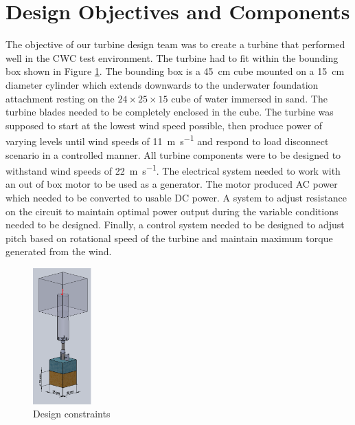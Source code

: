 \documentclass[../ewet_cwc_report.tex]{subfiles}
\begin{document}
\section{Design Objectives and Components}

\noindent
The objective of our turbine design team was to create a
turbine that performed well in the CWC test environment. The
turbine had to fit within the bounding box shown in
Figure \ref{img:constraints}. The bounding box is a
\qty{45}{\cm} cube mounted on a \qty{15}{\cm} diameter cylinder
which extends downwards to the underwater foundation attachment
resting on the $24 \times 25 \times 15$ cube of water immersed
in sand.  The turbine blades needed to be completely enclosed
in the cube. The turbine was supposed to start at the lowest
wind speed possible, then produce power of varying levels until
wind speeds of \qty{11}{\m\per\s} and respond to load
disconnect scenario in a controlled manner.  All turbine
components were to be designed to withstand wind speeds of
\qty{22}{\m\per\s}. The electrical system needed to work with
an out of box motor to be used as a generator. The motor
produced AC power which needed to be converted to usable DC
power. A system to adjust resistance on the circuit to maintain
optimal power output during the variable conditions needed to
be designed. Finally, a control system needed to be designed to
adjust pitch based on rotational speed of the turbine and
maintain maximum torque generated from the wind.

\begin{figure}[th]
  \centering
  \includegraphics[width=0.2\textwidth]{../_images/design_constraints.png}
  \caption{Design constraints}
  \label{img:constraints}
\end{figure}
\end{document}
